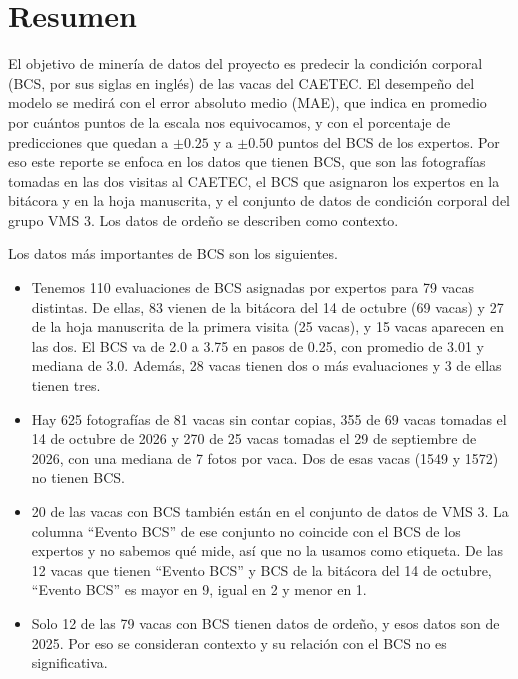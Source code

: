 \section*{Resumen}

El objetivo de minería de datos del proyecto es predecir la condición corporal (BCS, por sus siglas en inglés) de las vacas del CAETEC. El desempeño del modelo se medirá con el error absoluto medio (MAE), que indica en promedio por cuántos puntos de la escala nos equivocamos, y con el porcentaje de predicciones que quedan a $\pm0.25$ y a $\pm0.50$ puntos del BCS de los expertos. Por eso este reporte se enfoca en los datos que tienen BCS, que son las fotografías tomadas en las dos visitas al CAETEC, el BCS que asignaron los expertos en la bitácora y en la hoja manuscrita, y el conjunto de datos de condición corporal del grupo VMS 3. Los datos de ordeño se describen como contexto.

Los datos más importantes de BCS son los siguientes.

\begin{itemize}
  \item Tenemos 110 evaluaciones de BCS asignadas por expertos para 79 vacas distintas. De ellas, 83 vienen de la bitácora del 14 de octubre (69 vacas) y 27 de la hoja manuscrita de la primera visita (25 vacas), y 15 vacas aparecen en las dos. El BCS va de 2.0 a 3.75 en pasos de 0.25, con promedio de 3.01 y mediana de 3.0. Además, 28 vacas tienen dos o más evaluaciones y 3 de ellas tienen tres.
  \item Hay 625 fotografías de 81 vacas sin contar copias, 355 de 69 vacas tomadas el 14 de octubre de 2026 y 270 de 25 vacas tomadas el 29 de septiembre de 2026, con una mediana de 7 fotos por vaca. Dos de esas vacas (1549 y 1572) no tienen BCS.
  \item 20 de las vacas con BCS también están en el conjunto de datos de VMS 3. La columna ``Evento BCS'' de ese conjunto no coincide con el BCS de los expertos y no sabemos qué mide, así que no la usamos como etiqueta. De las 12 vacas que tienen ``Evento BCS'' y BCS de la bitácora del 14 de octubre, ``Evento BCS'' es mayor en 9, igual en 2 y menor en 1.
  \item Solo 12 de las 79 vacas con BCS tienen datos de ordeño, y esos datos son de 2025. Por eso se consideran contexto y su relación con el BCS no es significativa.
\end{itemize}
